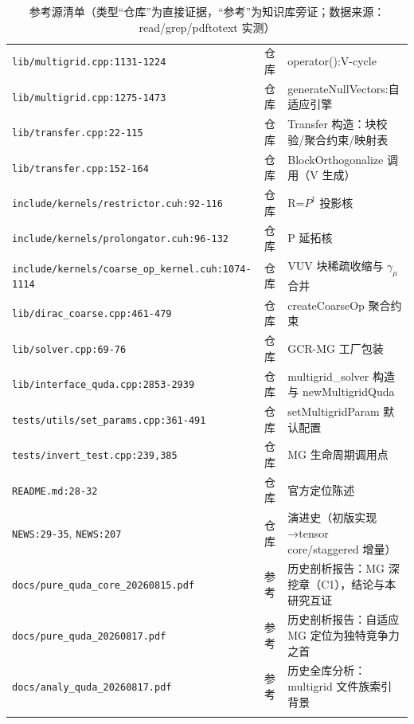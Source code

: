 \documentclass[UTF8]{ctexart}
\begin{document}
\begin{xltabular}{\textwidth}{llX}
\texttt{\nolinkurl{lib/multigrid.cpp:1131-1224}} & 仓库 & operator():V-cycle \\
\texttt{\nolinkurl{lib/multigrid.cpp:1275-1473}} & 仓库 & generateNullVectors:自适应引擎 \\
\texttt{\nolinkurl{lib/transfer.cpp:22-115}} & 仓库 & Transfer 构造：块校验/聚合约束/映射表 \\
\texttt{\nolinkurl{lib/transfer.cpp:152-164}} & 仓库 & BlockOrthogonalize 调用（V 生成） \\
\texttt{\nolinkurl{include/kernels/restrictor.cuh:92-116}} & 仓库 & R=$P^\dagger$ 投影核 \\
\texttt{\nolinkurl{include/kernels/prolongator.cuh:96-132}} & 仓库 & P 延拓核 \\
\texttt{\nolinkurl{include/kernels/coarse_op_kernel.cuh:1074-1114}} & 仓库 & VUV 块稀疏收缩与 $\gamma_\mu$ 合并 \\
\texttt{\nolinkurl{lib/dirac_coarse.cpp:461-479}} & 仓库 & createCoarseOp 聚合约束 \\
\texttt{\nolinkurl{lib/solver.cpp:69-76}} & 仓库 & GCR-MG 工厂包装 \\
\texttt{\nolinkurl{lib/interface_quda.cpp:2853-2939}} & 仓库 & multigrid\_solver 构造与 newMultigridQuda \\
\texttt{\nolinkurl{tests/utils/set_params.cpp:361-491}} & 仓库 & setMultigridParam 默认配置 \\
\texttt{\nolinkurl{tests/invert_test.cpp:239,385}} & 仓库 & MG 生命周期调用点 \\
\texttt{\nolinkurl{README.md:28-32}} & 仓库 & 官方定位陈述 \\
\texttt{\nolinkurl{NEWS:29-35}}, \texttt{\nolinkurl{NEWS:207}} & 仓库 & 演进史（初版实现→tensor core/staggered 增量） \\
\textcolor{reference}{\texttt{\nolinkurl{docs/pure_quda_core_20260815.pdf}}} & 参考 & 历史剖析报告：MG 深挖章（C1），结论与本研究互证 \\
\textcolor{reference}{\texttt{\nolinkurl{docs/pure_quda_20260817.pdf}}} & 参考 & 历史剖析报告：自适应 MG 定位为独特竞争力之首 \\
\textcolor{reference}{\texttt{\nolinkurl{docs/analy_quda_20260817.pdf}}} & 参考 & 历史全库分析：multigrid 文件族索引背景 \\
\bottomrule
\caption{参考源清单（类型``仓库''为直接证据，``参考''为知识库旁证；数据来源：read/grep/pdftotext 实测）}
\end{xltabular}

\end{document}
